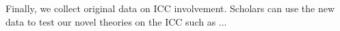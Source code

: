 Finally, we collect original data on ICC involvement. Scholars can use the new data to test our novel theories on the ICC such as ...




